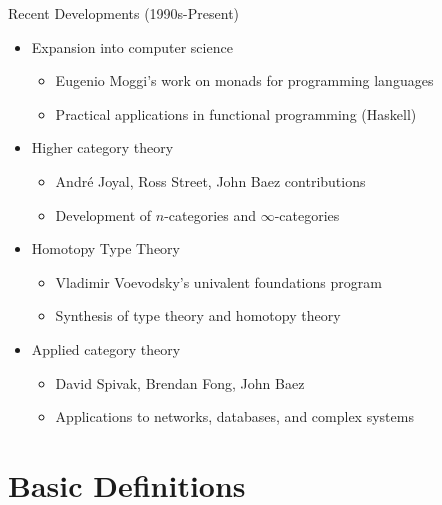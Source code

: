 \documentclass{beamer}
\begin{document}
\begin{frame}{Recent Developments (1990s-Present)}
    \begin{itemize}
        \item Expansion into computer science
            \begin{itemize}
                \item Eugenio Moggi's work on monads for programming languages
                \item Practical applications in functional programming (Haskell)
            \end{itemize}
        \item Higher category theory
            \begin{itemize}
                \item André Joyal, Ross Street, John Baez contributions
                \item Development of $n$-categories and $\infty$-categories
            \end{itemize}
        \item Homotopy Type Theory
            \begin{itemize}
                \item Vladimir Voevodsky's univalent foundations program
                \item Synthesis of type theory and homotopy theory
            \end{itemize}
        \item Applied category theory
            \begin{itemize}
                \item David Spivak, Brendan Fong, John Baez
                \item Applications to networks, databases, and complex systems
            \end{itemize}
    \end{itemize}
\end{frame}

\section{Basic Definitions}
\end{document}
